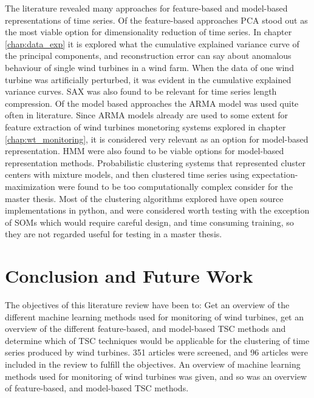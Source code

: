 The literature revealed many approaches for feature-based and model-based representations of time series. 
Of the feature-based approaches PCA stood out as the most viable option for dimensionality reduction of time series. 
In chapter \ref{chap:data_exp} it is explored what the cumulative explained variance curve of the principal components, and reconstruction error can say about anomalous behaviour of single wind turbines in a wind farm. 
When the data of one wind turbine was artificially perturbed, it was evident in the cumulative explained variance curves. 
SAX was also found to be relevant for time series length compression. 
Of the model based approaches the ARMA model was used quite often in literature. Since ARMA models already are used to some extent for feature extraction of wind turbines monetoring systems explored in chapter \ref{chap:wt_monitoring}, it is considered very relevant as an option for model-based representation. 
HMM were also found to be viable options for model-based representation methods.
Probabilistic clustering systems that represented cluster centers with mixture models, and then clustered time series using expectation-maximization were found to be too computationally complex consider for the master thesis. 
Most of the clustering algorithms explored have open source implementations in python, and were considered worth testing with the exception of SOMs which would require careful design, and time consuming training, so they are not regarded useful for testing in a master thesis. 

\chapter{Conclusion and Future Work}
The objectives of this literature review have been to: Get an overview of the different machine learning methods used for monitoring of wind turbines, get an overview of the different feature-based, and model-based TSC methods and determine which of TSC techniques would be applicable for the clustering of time series produced by wind turbines. 351 articles were screened, and 96 articles were included in the review to fulfill the objectives. An overview of machine learning methods used for monitoring of wind turbines was given, and so was an overview of feature-based, and model-based TSC methods. 


